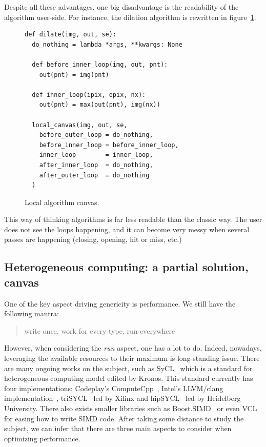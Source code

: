 Despite all these advantages, one big disadvantage is the readability of the algorithm user-side. For instance, the
dilation algorithm is rewritten in figure~\ref{code:local.algorithm.dilate}.

\begin{figure}[htbp]
  \centering
  \begin{verbatim}
def dilate(img, out, se):
  do_nothing = lambda *args, **kwargs: None

  def before_inner_loop(img, out, pnt):
    out(pnt) = img(pnt)

  def inner_loop(ipix, opix, nx):
    out(pnt) = max(out(pnt), img(nx))

  local_canvas(img, out, se,
    before_outer_loop = do_nothing,
    before_inner_loop = before_inner_loop,
    inner_loop        = inner_loop,
    after_inner_loop  = do_nothing,
    after_outer_loop  = do_nothing
  )
  \end{verbatim}

  \caption{Local algorithm canvas.}
  \label{code:local.algorithm.dilate}
\end{figure}

This way of thinking algorithms is far less readable than the classic way. The user does not see the loops happening,
and it can become very messy when several passes are happening (closing, opening, hit or miss, etc.)


\subsection{Heterogeneous computing: a partial solution, canvas}
\label{subsec:heterogeneous}

One of the key aspect driving genericity is performance. We still have the following mantra: \blockquote{write once,
  work for every type, run everywhere}. However, when considering the \emph{run} aspect, one has a lot to do. Indeed,
nowadays, leveraging the available resources to their maximum is long-standing issue. There are many ongoing works on
the subject, such as SyCL~\parencite{brown.2019.heterogeneous,wong.2019.heterogeneous} which is a standard for
heterogeneous computing model edited by Kronos. This standard currently has four implementations: Codeplay's
ComputeCpp~\parencite{codeplay.2021.computecpp}, Intel's LLVM/clang implementation~\parencite{intel-llvm.2021.sycl},
triSYCL~\parencite{xilinx.2021.triSYCL} led by Xilinx and hipSYCL~\parencite{aksel.2020.hipsycl} led by Heidelberg
University. There also exists smaller libraries such as Boost.SIMD~\parencite{esterie.2014.boostsimd} or even
VCL~\parencite{fog.2013.vcl} for easing how to write SIMD code. After taking some distance to study the subject, we can
infer that there are three main aspects to consider when optimizing performance.

